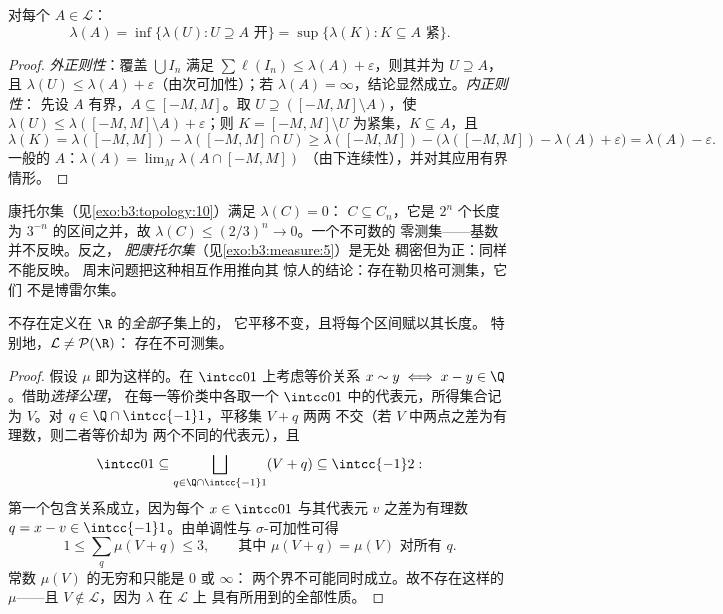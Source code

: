 \begin{theorem}[正则性]\label{thm:b3:measure:regularity}
对每个 $A \in \mathcal L$：
\[
\lambda(A) = \inf\{\lambda(U) : U \supseteq A \text{ 开}\}
= \sup\{\lambda(K) : K \subseteq A \text{ 紧}\}.
\]
\end{theorem}

\begin{proof}
\emph{外正则性}：覆盖 $\bigcup I_n$ 满足 $\sum\ell(I_n) \leq
\lambda(A) + \varepsilon$，则其并为 $U \supseteq A$，且
$\lambda(U) \leq \lambda(A) + \varepsilon$（由次可加性）；若
$\lambda(A) = \infty$，结论显然成立。\emph{内正则性}：
先设 $A$ 有界，$A \subseteq [-M, M]$。取
$U \supseteq ([-M,M]\setminus A)$，使 $\lambda(U) \leq
\lambda([-M,M]\setminus A) + \varepsilon$；则 $K = [-M,
M]\setminus U$ 为紧集，$K \subseteq A$，且
\[
\lambda(K) = \lambda([-M,M]) - \lambda([-M,M]\cap U)
\geq \lambda([-M,M]) - \bigl(\lambda([-M,M]) - \lambda(A) +
\varepsilon\bigr) = \lambda(A) - \varepsilon .
\]
一般的 $A$：$\lambda(A) = \lim_M\lambda(A\cap[-M,M])$
（由下连续性），并对其应用有界情形。
\end{proof}

\begin{example}\label{ex:b3:measure:cantor}
康托尔集（见\cref{exo:b3:topology:10}）满足 $\lambda(C) = 0$：
$C \subseteq C_n$，它是 $2^n$ 个长度为
$3^{-n}$ 的区间之并，故 $\lambda(C) \leq (2/3)^n \to 0$。一个不可数的
零测集——基数并不反映。反之，
\emph{肥康托尔集}（见\cref{exo:b3:measure:5}）是无处
稠密但为正：同样不能反映。
周末问题把这种相互作用推向其
惊人的结论：存在勒贝格可测集，它们
不是博雷尔集。
\end{example}

\begin{theorem}[维塔利]\label{thm:b3:measure:vitali}
不存在定义在 $\R$ 的\emph{全部}子集上的，
它平移不变，且将每个区间赋以其长度。
特别地，$\mathcal L \neq \mathcal P(\R)$：
存在不可测集。
\end{theorem}

\begin{proof}
假设 $\mu$ 即为这样的。在 $\intcc01$ 上考虑等价关系
$x \sim y \iff x - y \in \Q$。借助\emph{选择公理}，
在每一等价类中各取一个 $\intcc01$ 中的代表元，所得集合记为 $V$。对
$q \in \Q\cap\intcc{-1}1$，平移集 $V + q$ 两两
不交（若 $V$ 中两点之差为有理数，则二者等价却为
两个不同的代表元），且
\[
\intcc01 \subseteq \bigsqcup_{q \in \Q\cap\intcc{-1}1}(V + q)
\subseteq \intcc{-1}2 :
\]
第一个包含关系成立，因为每个 $x \in \intcc01$ 与其代表元
$v$ 之差为有理数 $q = x - v \in
\intcc{-1}1$。由单调性与 $\sigma$-可加性可得
\[
1 \leq \sum_{q}\mu(V + q) \leq 3,
\qquad\text{其中 } \mu(V + q) = \mu(V) \text{ 对所有 } q .
\]
常数 $\mu(V)$ 的无穷和只能是 $0$ 或 $\infty$：
两个界不可能同时成立。故不存在这样的 $\mu$——且 $V
\notin \mathcal L$，因为 $\lambda$ 在 $\mathcal L$ 上
具有所用到的全部性质。
\end{proof}

